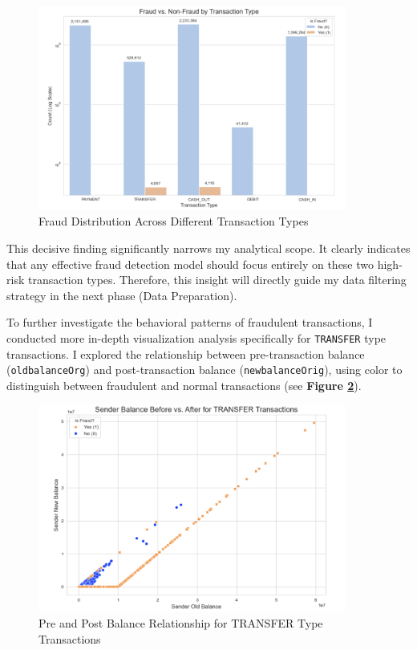 \documentclass[sigplan,screen]{acmart}
\begin{document}
\begin{figure}[h!]
    \centering
    \includegraphics[width=0.9\textwidth]{2.3.2.png}
    \caption{Fraud Distribution Across Different Transaction Types}
    \label{fig:fraud_distribution}
\end{figure}

This decisive finding significantly narrows my analytical scope. It clearly indicates that any effective fraud detection model should focus entirely on these two high-risk transaction types. Therefore, this insight will directly guide my data filtering strategy in the next phase (Data Preparation).

To further investigate the behavioral patterns of fraudulent transactions, I conducted more in-depth visualization analysis specifically for \texttt{TRANSFER} type transactions. I explored the relationship between pre-transaction balance (\texttt{oldbalanceOrg}) and post-transaction balance (\texttt{newbalanceOrig}), using color to distinguish between fraudulent and normal transactions (see \textbf{Figure \ref{fig:transfer_analysis}}).

\begin{figure}[h!]
    \centering
    \includegraphics[width=0.9\textwidth]{2.3.3.png}
    \caption{Pre and Post Balance Relationship for TRANSFER Type Transactions}
    \label{fig:transfer_analysis}
\end{figure}
\end{document}
